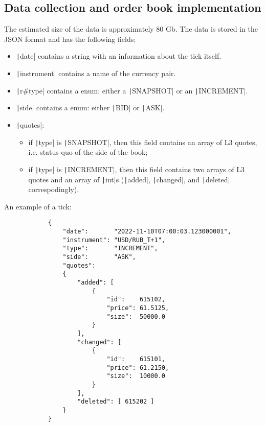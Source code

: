 \begin{appendices} %
    \section{Data collection and  order book implementation}\label{appendix:data}
        The estimated size of the data is approximately 80 Gb. The data is stored in the JSON format and has the following fields:
        \begin{itemize}
            \item \texttt|date| contains a string with an information about the tick itself.
            \item \texttt|instrument| contains a name of the currency pair.
            \item \texttt|r#type| contains a enum: either a \texttt|SNAPSHOT| or an \texttt|INCREMENT|.
            \item \texttt|side| contains a enum: either \texttt|BID| or \texttt|ASK|.
            \item \texttt|quotes|:
                \begin{itemize}
                    \item if \texttt|type| is \texttt|SNAPSHOT|, then this field contains an array of L3 quotes, i.e. status quo of the side of the book;
                    \item if \texttt|type| is \texttt|INCREMENT|, then this field contains two arrays of L3 quotes and an array of \texttt|int|s (\texttt|added|, \texttt|changed|, and \texttt|deleted| correspodingly).
                \end{itemize}
        \end{itemize}
        An example of a tick: \begin{verbatim}
            {
                "date":       "2022-11-10T07:00:03.123000001",
                "instrument": "USD/RUB_T+1",
                "type":       "INCREMENT",
                "side":       "ASK",
                "quotes":
                {
                    "added": [
                        {
                            "id":    615102,
                            "price": 61.5125,
                            "size":  50000.0
                        }
                    ],
                    "changed": [
                        {
                            "id":    615101,
                            "price": 61.2150,
                            "size":  10000.0
                        }
                    ],
                    "deleted": [ 615202 ]
                }
            }
        \end{verbatim}


\end{appendices}

